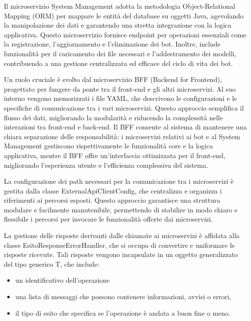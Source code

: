 \documentclass[a4paper,twoside,12pt]{toptesi}
\begin{document}
Il microservizio System Management adotta la metodologia Object-Relational Mapping (ORM) per mappare le entità del database su oggetti Java, agevolando la manipolazione dei dati e garantendo una stretta integrazione con la logica applicativa. Questo microservizio fornisce endpoint per operazioni essenziali come la registrazione, l'aggiornamento e l'eliminazione dei bot. Inoltre, include funzionalità per il caricamento dei file necessari e l'addestramento dei modelli, contribuendo a una gestione centralizzata ed efficace del ciclo di vita dei bot.

Un ruolo cruciale è svolto dal microservizio BFF (Backend for Frontend), progettato per fungere da ponte tra il front-end e gli altri microservizi. Al suo interno vengono memorizzati i file YAML, che descrivono le configurazioni e le specifiche di comunicazione tra i vari microservizi. Questo approccio semplifica il flusso dei dati, migliorando la modularità e riducendo la complessità nelle interazioni tra front-end e back-end. Il BFF consente al sistema di mantenere una chiara separazione delle responsabilità: i microservizi relativi ai bot e al System Management gestiscono rispettivamente le funzionalità core e la logica applicativa, mentre il BFF offre un'interfaccia ottimizzata per il front-end, migliorando l'esperienza utente e l'efficienza complessiva del sistema.

La configurazione dei path necessari per la comunicazione tra i microservizi è gestita dalla classe ExternalApiClientConfig, che centralizza e organizza i riferimenti ai percorsi esposti. Questo approccio garantisce una struttura modulare e facilmente manutenibile, permettendo di stabilire in modo chiaro e flessibile i percorsi per invocare le funzionalità offerte dai microservizi.

La gestione delle risposte derivanti dalle chiamate ai microservizi è affidata alla classe EsitoResponseErrorHandler, che si occupa di convertire e uniformare le risposte ricevute. Tali risposte vengono incapsulate in un oggetto generalizzato del tipo generico T, che include:

\begin{itemize}
\item un identificativo dell'operazione
\item una lista di messaggi che possono contenere informazioni, avvisi o errori,
\item il tipo di esito che specifica se l'operazione è andata a buon fine o meno.
\end{itemize}
\end{document}
